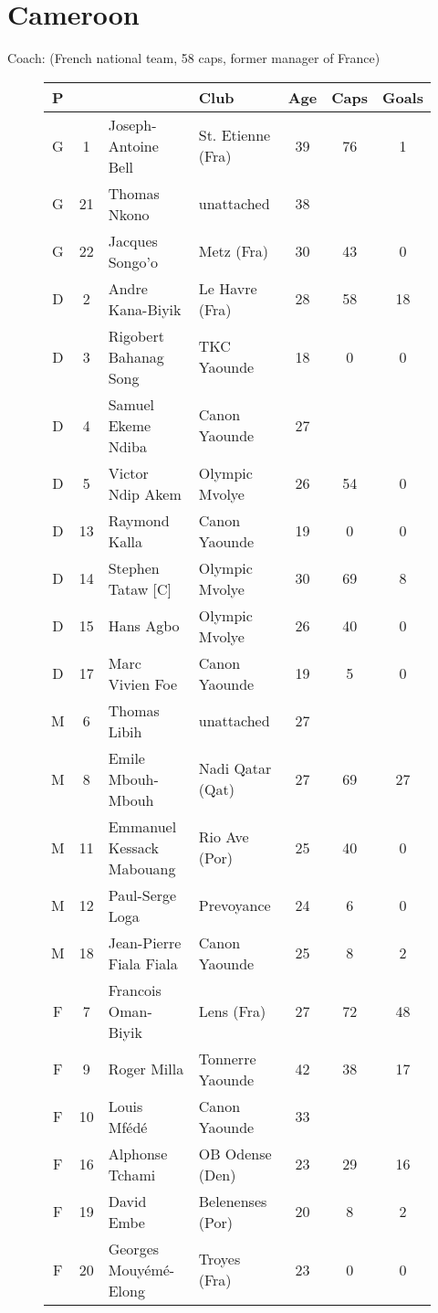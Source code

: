 \chapter{Cameroon}
\newline
\newline
Coach: (French national team, 58 caps, former manager of France)
\begin{figure}[H]
\begin{tabular}{c c l l c c c}
P & & & Club & Age & Caps & Goals \\ \hline
G & 1 &  Joseph-Antoine Bell & St. Etienne (Fra) & 39 & 76 & 1 \\
G & 21 & Thomas Nkono & unattached & 38 & & \\
G & 22 & Jacques Songo'o & Metz (Fra) & 30 & 43 & 0 \\ \hline
D & 2 & Andre Kana-Biyik & Le Havre (Fra) & 28 & 58 & 18 \\
D & 3 & Rigobert Bahanag Song & TKC Yaounde & 18  & 0  & 0 \\
D & 4 & Samuel Ekeme Ndiba  & Canon Yaounde & 27  &   & \\
D & 5 & Victor Ndip Akem & Olympic Mvolye & 26  & 54  & 0 \\
D & 13 & Raymond Kalla & Canon Yaounde & 19  & 0  & 0 \\
D & 14 & Stephen Tataw [C]  & Olympic Mvolye & 30  & 69  & 8 \\
D & 15 & Hans Agbo & Olympic Mvolye & 26  & 40  & 0 \\
D & 17 & Marc Vivien Foe &  Canon Yaounde & 19  & 5  & 0 \\ \hline
M & 6 & Thomas Libih & unattached & 27  &   &  \\
M & 8 & Emile Mbouh-Mbouh & Nadi Qatar (Qat) & 27  & 69  & 27 \\
M & 11 & Emmanuel Kessack Mabouang  & Rio Ave (Por) & 25  & 40  & 0 \\
M & 12 & Paul-Serge Loga &  Prevoyance & 24  & 6  & 0 \\
M & 18 & Jean-Pierre Fiala Fiala  & Canon Yaounde & 25  & 8  & 2 \\ \hline
F & 7 & Francois Oman-Biyik  & Lens (Fra) & 27  & 72  & 48 \\
F & 9 & Roger Milla & Tonnerre Yaounde & 42  & 38  & 17 \\
F & 10 & Louis Mf{\'e}d{\'e} & Canon Yaounde & 33  &   &  \\
F & 16 & Alphonse Tchami & OB Odense (Den) & 23  & 29  & 16 \\
F & 19 & David Embe & Belenenses (Por) & 20  & 8  & 2 \\
F & 20 & Georges Mouy{\'e}m{\'e}-Elong  & Troyes (Fra) & 23  & 0  & 0 \\ \hline
\end{tabular}
\end{figure}
